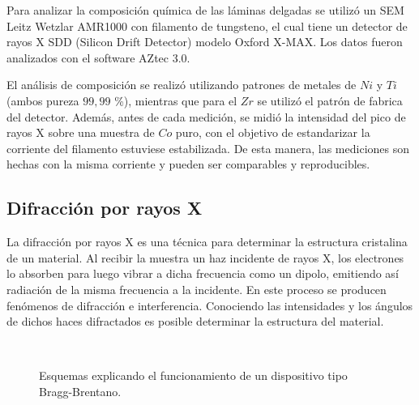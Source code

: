 \documentclass[12pt]{article}
\theoremstyle{definition}
\theoremstyle{remark}
\begin{document}
Para analizar la composición química de las láminas delgadas se utilizó un SEM Leitz Wetzlar AMR1000 con filamento de tungsteno, el cual tiene un detector de rayos X SDD (Silicon Drift Detector) modelo Oxford X-MAX. Los datos fueron analizados con el software AZtec 3.0.

El análisis de composición se realizó utilizando patrones de metales de $Ni$ y $Ti$ (ambos pureza $99,99$ \%), mientras que para el $Zr$ se utilizó el patrón de fabrica del detector. Además, antes de cada medición, se midió la intensidad del pico de rayos X sobre una muestra de $Co$ puro, con el objetivo de estandarizar la corriente del filamento estuviese estabilizada. De esta manera, las mediciones son hechas con la misma corriente y pueden ser comparables y reproducibles.

\subsection{Difracción por rayos X}
 La difracción por rayos X es una técnica para determinar la estructura cristalina de un material. Al recibir la muestra un haz incidente de rayos X, los electrones lo absorben para luego vibrar a dicha frecuencia como un dipolo, emitiendo así radiación de la misma frecuencia a la incidente. En este proceso se producen fenómenos de difracción e interferencia.  Conociendo las intensidades y los ángulos de dichos haces difractados es posible determinar la estructura del material.
 
\begin{figure}[H]
\centering
{} \\
\caption{Esquemas explicando el funcionamiento de un dispositivo tipo Bragg-Brentano.}
\label{Rxesquema}
\end{figure}
 
\end{document}
